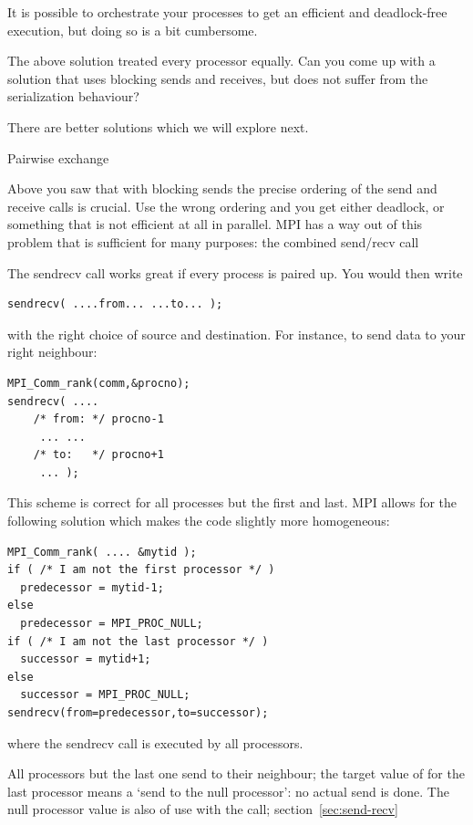 It is possible to orchestrate your processes to get an efficient and
deadlock-free execution, but doing so is a bit cumbersome.

\begin{exercise}
  The above solution treated every processor equally. Can you come up
  with a solution that uses blocking sends and receives, but does not
  suffer from the serialization behaviour?
\end{exercise}

There are better solutions which we will
explore next.


 {Pairwise exchange}
\label{sec:send-recv}

Above you saw that with blocking sends the precise ordering of the
send and receive calls is crucial. Use the wrong ordering and you get
either deadlock, or something that is not efficient at all in
parallel. MPI has a way out of this problem that is sufficient for
many purposes: the combined send/recv call


The sendrecv call works great if every process is paired up.
You would then write
\begin{lstlisting}
sendrecv( ....from... ...to... );
\end{lstlisting}
with the right choice of source and destination. For instance, to send
data to your right neighbour:
\begin{lstlisting}
MPI_Comm_rank(comm,&procno);
sendrecv( .... 
    /* from: */ procno-1
     ... ... 
    /* to:   */ procno+1
     ... );
\end{lstlisting}
This scheme is correct for all processes but the first and last. 
MPI allows for the following solution which makes the code slightly 
more homogeneous:
\begin{lstlisting}
MPI_Comm_rank( .... &mytid );
if ( /* I am not the first processor */ )
  predecessor = mytid-1;
else
  predecessor = MPI_PROC_NULL;
if ( /* I am not the last processor */ )
  successor = mytid+1;
else
  successor = MPI_PROC_NULL;
sendrecv(from=predecessor,to=successor);
\end{lstlisting}
where the sendrecv call is executed by all processors.

All processors but the last one send to their neighbour; the target
value of  for
the last processor means a `send to the null processor': no actual
send is done.
%
%
The null processor value is also of use with the
 call; section~\ref{sec:send-recv}

